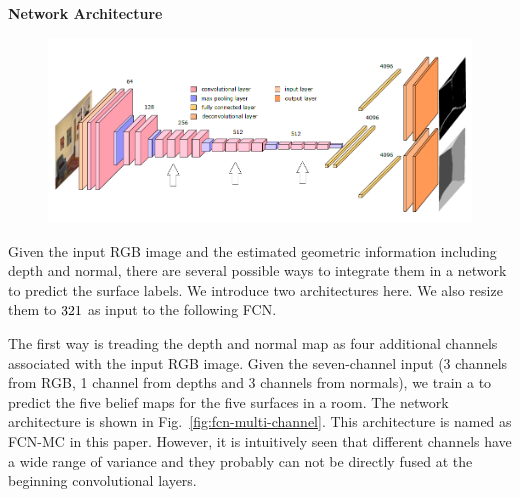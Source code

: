 \textbf{Network Architecture}

\begin{figure}
	\centering
	\includegraphics[width=\columnwidth]{figure/coarse-to-fine-net.png}
	\label{fig:coarsetofine}
\end{figure}

Given the input RGB image and the estimated geometric information including depth and normal, there are several possible ways to integrate them in a network to predict the surface labels. We introduce two architectures here.
We also resize them to $321 \time 321$ as input to the following FCN. 

The first way is treading the depth and normal map as four additional channels associated with the input RGB image. Given the seven-channel input (3 channels from RGB, 1 channel from depths and 3 channels from normals), we train a  to predict the five belief maps for the five surfaces in a room. The network architecture is shown in Fig.~\ref{fig:fcn-multi-channel}. This architecture is named as FCN-MC in this paper. 
%
However, it is intuitively seen that different channels have a wide range of variance and they probably can not be directly fused at the beginning convolutional layers. 

